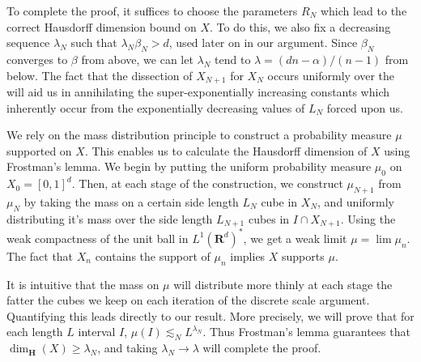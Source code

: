 \documentclass{article}
\theoremstyle{plain}
\theoremstyle{plain}
\begin{document}
\begin{multicols}{2}
To complete the proof, it suffices to choose the parameters $R_N$ which lead to the correct Hausdorff dimension bound on $X$. To do this, we also fix a decreasing sequence $\lambda_N$ such that $\lambda_N \beta_N > d$, used later on in our argument. Since $\beta_N$ converges to $\beta$ from above, we can let $\lambda_N$ tend to $\lambda = (dn - \alpha)/(n - 1)$ from below. The fact that the dissection of $X_{N+1}$ for $X_N$ occurs uniformly over the will aid us in annihilating the super-exponentially increasing constants which inherently occur from the exponentially decreasing values of $L_N$ forced upon us.

We rely on the mass distribution principle to construct a probability measure $\mu$ supported on $X$. This enables us to calculate the Hausdorff dimension of $X$ using Frostman's lemma. We begin by putting the uniform probability measure $\mu_0$ on $X_0 = [0,1]^d$. Then, at each stage of the construction, we construct $\mu_{N+1}$ from $\mu_N$ by taking the mass on a certain side length $L_N$ cube in $X_N$, and uniformly distributing it's mass over the side length $L_{N+1}$ cubes in $I \cap X_{N+1}$. Using the weak compactness of the unit ball in $L^1(\mathbf{R}^d)^*$, we get a weak limit $\mu = \lim \mu_n$. The fact that $X_n$ contains the support of $\mu_n$ implies $X$ supports $\mu$.

It is intuitive that the mass on $\mu$ will distribute more thinly at each stage the fatter the cubes we keep on each iteration of the discrete scale argument. Quantifying this leads directly to our result. More precisely, we will prove that for each length $L$ interval $I$, $\mu(I) \lesssim_N L^{\lambda_N}$. Thus Frostman's lemma guarantees that $\dim_{\mathbf{H}}(X) \geq \lambda_N$, and taking $\lambda_N \to \lambda$ will complete the proof.


\end{multicols}
\end{document}
